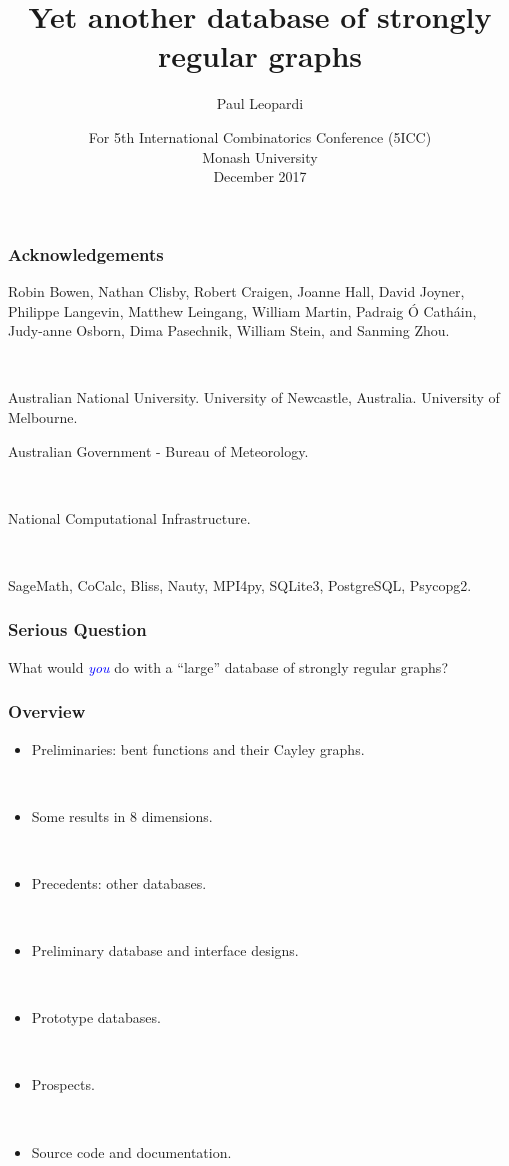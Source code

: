 \documentclass[pdf,sprung,slideColor,nocolorBG]{beamer}
\title{Yet another database of strongly regular graphs}
\author{Paul Leopardi}
\date{For 5th International Combinatorics Conference (5ICC)
\\
Monash University
\\
December 2017}
\institute{University of Melbourne
\\
Australian Government - Bureau of Meteorology}
\newcommand{\Emph}[1]{\emph{\textcolor{blue}{#1}}}
\begin{document}
\frame{\titlepage}
\begin{frame}
\frametitle{Acknowledgements}
\begin{center}
Robin Bowen,
Nathan Clisby,
Robert Craigen,
Joanne Hall,
David Joyner,
Philippe Langevin,
Matthew Leingang,
William Martin,
Padraig {\'O} Cath{\'a}in,
Judy-anne Osborn,
Dima Pasechnik,
William Stein, and
Sanming Zhou.

~

Australian National University. University of Newcastle, Australia. University of Melbourne.

Australian Government - Bureau of Meteorology.

~

National Computational Infrastructure.

~

SageMath, CoCalc, Bliss, Nauty, MPI4py, SQLite3, PostgreSQL, Psycopg2.
\end{center}
\end{frame}

\begin{frame}
\frametitle{Serious Question}
\begin{center}
\vspace{+12mm}
\large{}
What would \Emph{you} do with a ``large'' database of strongly regular graphs?
\normalsize{}
\end{center}
\end{frame}

\begin{frame}
\frametitle{Overview}
\begin{itemize}
\item
Preliminaries: bent functions and their Cayley graphs.

~

\item
Some results in 8 dimensions.

~

\item
Precedents: other databases.

~

\item
Preliminary database and interface designs.

~

\item
Prototype databases.

~

\item
Prospects.

~

\item
Source code and documentation.
\end{itemize}

\end{frame}
\end{document}
